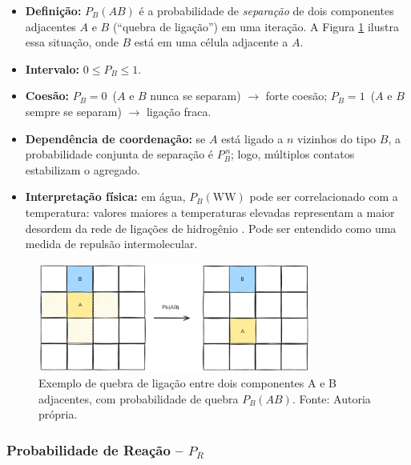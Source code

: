 \documentclass[12pt,oneside]{report}
\begin{document}
\begin{itemize}
    \item \textbf{Definição:} $P_B(AB)$ é a probabilidade de
          \emph{separação} de dois componentes adjacentes $A$ e $B$
          (``quebra de ligação'') em uma iteração. A Figura \ref{fig:quebra_ligacao} ilustra essa situação, onde $B$ está em uma célula adjacente a $A$.
    \item \textbf{Intervalo:} $0 \le P_B \le 1$.
    \item \textbf{Coesão:} $P_B=0$ \,($A$ e $B$ nunca se separam)
          $\rightarrow$ forte coesão;
          $P_B=1$ \,($A$ e $B$ sempre se separam) $\rightarrow$ ligação fraca.
    \item \textbf{Dependência de coordenação:} se $A$ está ligado a
          $n$ vizinhos do tipo $B$, a probabilidade conjunta de separação é
          $P_B^{\,n}$; logo, múltiplos contatos estabilizam o agregado.
    \item \textbf{Interpretação física:}
          em água, $P_B(\mathrm{WW})$ pode ser correlacionado com a temperatura:
          valores maiores a temperaturas elevadas representam a maior
          desordem da rede de ligações de hidrogênio \cite{kier2005}. Pode ser entendido como uma medida de repulsão intermolecular.
\end{itemize}

\begin{figure}[H]
    \centering
    \includegraphics[width=0.8\textwidth]{img/PbAB.png}
    \caption{\small Exemplo de quebra de ligação entre dois componentes A e B adjacentes, com probabilidade de quebra $P_B(AB)$. Fonte: Autoria própria.}
    \label{fig:quebra_ligacao}
\end{figure}

\subsubsection{Probabilidade de Reação – \texorpdfstring{$P_R$}{Pr}}
\label{subsubsec:Pr}
\end{document}
